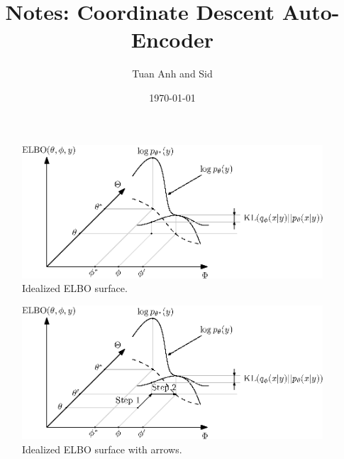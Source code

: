 \documentclass[a4paper]{article}
\title{Notes: Coordinate Descent Auto-Encoder}
\author{Tuan Anh and Sid}
\date{\today}
\begin{document}
\maketitle

\listoftodos






\begin{figure}
    \centering
    \includegraphics{figures/elbo}
    \caption{Idealized \gls{ELBO} surface.}
\end{figure}

\begin{figure}
    \centering
    \includegraphics{figures/elbo2}
    \caption{Idealized \gls{ELBO} surface with arrows.}
\end{figure}


\end{document}
